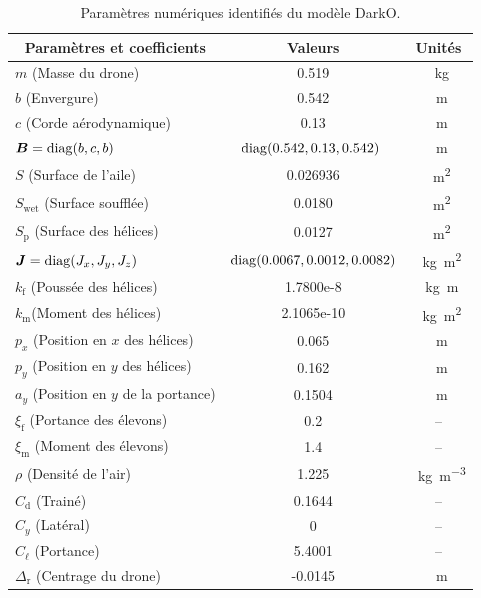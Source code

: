 \begin{table}[ht]
    \centering
      \begin{tabular}{|l|c|c|}
        \hline
        \multicolumn{1}{|c|}{Paramètres et coefficients} & Valeurs & Unités \\
        \hline
        $m$ (Masse du drone)  & 0.519 & \SI{}{\kilogram} \\
        \hline
        $b$ (Envergure)  & 0.542 & \SI{}{\meter} \\
        \hline
        $c$ (Corde aérodynamique)  & 0.13 & \SI{}{\meter} \\
        \hline
        $\boldsymbol{B}=\operatorname{diag}(b,c,b)$ & $\!\!\operatorname{diag}(0.542, 0.13, 0.542)$ \!\! & \SI{}{\meter}\\
        \hline
        $S$ (Surface de l'aile) & 0.026936 & \SI{}{\square\meter}\\
        \hline
        $S_{\text{wet}}$ (Surface soufflée) & 0.0180 & \SI{}{\square\meter}\\
        \hline
        $S_{\text{p}}$ (Surface des hélices) & 0.0127 & \SI{}{\square\meter}\\
        \hline
        $\boldsymbol{J}=\operatorname{diag}(J_{x},J_{y},J_{z})$ & \!\! $\operatorname{diag}(0.0067,0.0012,0.0082)$\!\! & \SI{}{\kilogram\square\meter}\\
        \hline
        $k_{\text{f}}$ (Poussée des hélices) & 1.7800e-8 & \SI{}{\kilogram\meter}\\
        \hline
        $k_{\text{m}}$(Moment des hélices) & 2.1065e-10 & \SI{}{\kilogram\square\meter}\\
        \hline
        $p_{x}$ (Position en $x$ des hélices) & 0.065 & \SI{}{\meter}\\
        \hline
        $p_{y}$ (Position en $y$  des hélices) & 0.162 & \SI{}{\meter}\\
        \hline
        $a_{y}$ (Position en $y$ de la portance) & 0.1504 & \SI{}{\meter}\\
        \hline
        $\xi_{\text{f}}$ (Portance des élevons) & 0.2 & --\\
        \hline
        $\xi_{\text{m}}$ (Moment des élevons) & 1.4 & --\\
        \hline
        $\rho$ (Densité de l'air) & 1.225 & \SI{}{\kilogram\per\cubic\meter}\\
        \hline
        $C_{\text{d}}$ (Trainé) & 0.1644 & --\\
        \hline
        $C_{y}$ (Latéral) & 0 & --\\
        \hline
         $C_{\ell}$ (Portance) & 5.4001 & --\\
        \hline
        $\Delta_{\text{r}}$ (Centrage du drone) & -0.0145 & \SI{}{\meter}\\
        \hline
      \end{tabular}
      \caption{Paramètres numériques identifiés du modèle DarkO.}
      \label{tab:pars}
\end{table}

